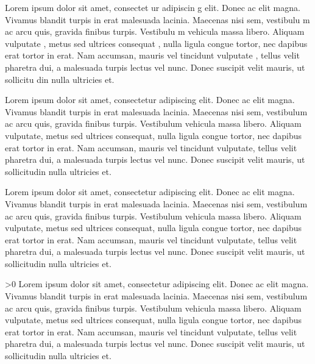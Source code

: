 \begin{something}
	Lorem
	ipsum
	dolor sit
	amet,
	consectet
	ur
	adipiscin
	g elit.
	Donec ac
	elit
	magna.
	Vivamus
	blandit
	turpis in
	erat
	malesuada
	lacinia.
	Maecenas
	nisi sem,
	vestibulu
	m ac arcu
	quis,
	gravida
	finibus
	turpis.
	Vestibulu
	m
	vehicula
	massa
	libero.
	Aliquam
	vulputate
	, metus
	sed
	ultrices
	consequat
	, nulla
	ligula
	congue
	tortor,
	nec
	dapibus
	erat
	tortor in
	erat. Nam
	accumsan,
	mauris
	vel
	tincidunt
	vulputate
	, tellus
	velit
	pharetra
	dui, a
	malesuada
	turpis
	lectus
	vel nunc.
	Donec
	suscipit
	velit
	mauris,
	ut
	sollicitu
	din nulla
	ultricies
	et.
\end{something}
\begin{another}
	Lorem ipsum dolor sit amet,
	consectetur adipiscing elit.
	Donec ac elit magna. Vivamus
	blandit turpis in erat
	malesuada lacinia. Maecenas
	nisi sem, vestibulum ac arcu
	quis, gravida finibus turpis.
	 Vestibulum vehicula massa
	libero. Aliquam vulputate,
	metus sed ultrices consequat,
	nulla ligula congue tortor,
	nec dapibus erat tortor in
	erat. Nam accumsan, mauris
	vel tincidunt vulputate,
	tellus velit pharetra dui, a
	malesuada turpis lectus vel
	nunc. Donec suscipit velit
	mauris, ut sollicitudin nulla
	ultricies et.
\end{another}
\begin{cmh}
	Lorem ipsum dolor sit amet, consectetur adipiscing elit. Donec ac elit magna.
	Vivamus blandit turpis in erat malesuada lacinia. Maecenas nisi sem, vestibulum
	ac arcu quis, gravida finibus turpis.  Vestibulum vehicula massa libero.
	Aliquam vulputate, metus sed ultrices consequat, nulla ligula congue tortor,
	nec dapibus erat tortor in erat. Nam accumsan, mauris vel tincidunt vulputate,
	tellus velit pharetra dui, a malesuada turpis lectus vel nunc. Donec suscipit
	velit mauris, ut sollicitudin nulla ultricies et.
\end{cmh}
\ifnum\x>0
	Lorem ipsum dolor sit amet, consectetur adipiscing elit. Donec ac elit magna.
	Vivamus blandit turpis in erat malesuada lacinia. Maecenas nisi sem, vestibulum
	ac arcu quis, gravida finibus turpis.  Vestibulum vehicula massa libero.
	Aliquam vulputate, metus sed ultrices consequat, nulla ligula congue tortor,
	nec dapibus erat tortor in erat. Nam accumsan, mauris vel tincidunt vulputate,
	tellus velit pharetra dui, a malesuada turpis lectus vel nunc. Donec suscipit
	velit mauris, ut sollicitudin nulla ultricies et.
\fi
